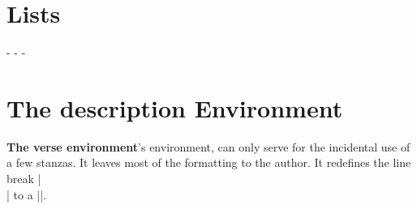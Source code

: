 \section{Lists}                                      
\label{sec:booklists}
\begin{teX}
\if@twocolumn
  \setlength\leftmargini  {2em}
\else
  \setlength\leftmargini  {2.5em}
\fi
\leftmargin  \leftmargini
\setlength\leftmarginii  {2.2em}
\setlength\leftmarginiii {1.87em}
\setlength\leftmarginiv  {1.7em}
\if@twocolumn
  \setlength\leftmarginv  {.5em}
  \setlength\leftmarginvi {.5em}
\else
  \setlength\leftmarginv  {1em}
  \setlength\leftmarginvi {1em}
\fi
\setlength  {}
\setlength  {}
\addtolength{}
\@beginparpenalty -\@lowpenalty
\@endparpenalty   -\@lowpenalty
\@itempenalty     -\@lowpenalty
\renewcommand\theenumi{\@arabic\c@enumi}
\renewcommand\theenumii{\@alph\c@enumii}
\renewcommand\theenumiii{\@roman\c@enumiii}
\renewcommand\theenumiv{\@Alph\c@enumiv}
\newcommand\labelenumi{\theenumi.}
\newcommand\labelenumii{(\theenumii)}
\newcommand\labelenumiii{\theenumiii.}
\newcommand\labelenumiv{\theenumiv.}
\renewcommand\p@enumii{\theenumi}
\renewcommand\p@enumiii{\theenumi(\theenumii)}
\renewcommand\p@enumiv{\p@enumiii\theenumiii}
\newcommand\labelitemi{\textbullet}
\newcommand\labelitemii{\normalfont\bfseries \textendash}
\newcommand\labelitemiii{\textasteriskcentered}
\newcommand\labelitemiv{\textperiodcentered}
\end{teX}
\section{The description Environment}

\begin{teX}
\newenvironment{description}
               {\list{}{\labelwidth\z@ \itemindent-\leftmargin
                        \let\makelabel\descriptionlabel}}
               {\endlist}
\newcommand*\descriptionlabel[1]{\hspace\labelsep
                                \normalfont\bfseries #1}
\end{teX}

\begin{multicols}{2}
\textbf{The verse environment}\quad \latex's  environment, can only serve for the incidental use of a few stanzas. It leaves most of the formatting to the author.  It redefines the line break |\\| to a |\centercr|.
\end{multicols}

